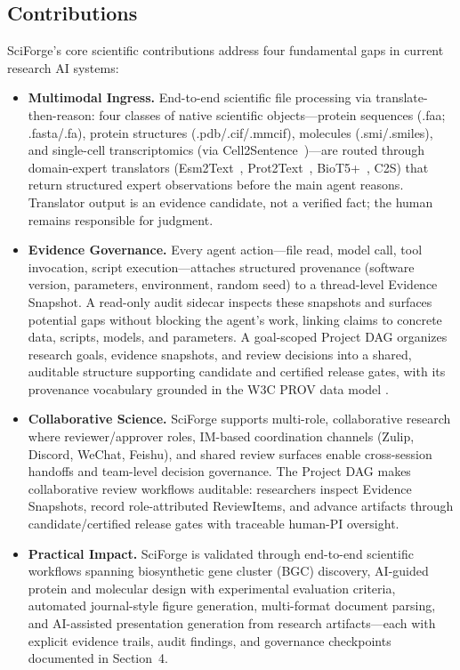 \documentclass[sn-basic,Numbered,pdflatex]{sn-jnl}
\begin{document}
\subsection{Contributions}

SciForge's core scientific contributions address four fundamental gaps in current research AI systems:
\begin{itemize}
    \item \textbf{Multimodal Ingress.} End-to-end scientific file processing via translate-then-reason: four classes of native scientific objects---protein sequences (.faa; .fasta/.fa), protein structures (.pdb/.cif/.mmcif), molecules (.smi/.smiles), and single-cell transcriptomics (via Cell2Sentence~\cite{rizvi2025c2s})---are routed through domain-expert translators (Esm2Text~\cite{lin2023esm2}, Prot2Text~\cite{abdine2023prot2text}, BioT5+~\cite{pei2024biot5}, C2S) that return structured expert observations before the main agent reasons. Translator output is an evidence candidate, not a verified fact; the human remains responsible for judgment.

    \item \textbf{Evidence Governance.} Every agent action---file read, model call, tool invocation, script execution---attaches structured provenance (software version, parameters, environment, random seed) to a thread-level Evidence Snapshot. A read-only audit sidecar inspects these snapshots and surfaces potential gaps without blocking the agent's work, linking claims to concrete data, scripts, models, and parameters. A goal-scoped Project DAG organizes research goals, evidence snapshots, and review decisions into a shared, auditable structure supporting candidate and certified release gates, with its provenance vocabulary grounded in the W3C PROV data model \cite{w3cprov2013}.

    \item \textbf{Collaborative Science.} SciForge supports multi-role, collaborative research where reviewer/approver roles, IM-based coordination channels (Zulip, Discord, WeChat, Feishu), and shared review surfaces enable cross-session handoffs and team-level decision governance. The Project DAG makes collaborative review workflows auditable: researchers inspect Evidence Snapshots, record role-attributed ReviewItems, and advance artifacts through candidate/certified release gates with traceable human-PI oversight.

    \item \textbf{Practical Impact.} SciForge is validated through end-to-end scientific workflows spanning biosynthetic gene cluster (BGC) discovery, AI-guided protein and molecular design with experimental evaluation criteria, automated journal-style figure generation, multi-format document parsing, and AI-assisted presentation generation from research artifacts---each with explicit evidence trails, audit findings, and governance checkpoints documented in Section~4.
\end{itemize}
\end{document}
